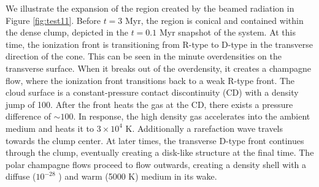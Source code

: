 \documentclass[apj,onecolumn]{emulateapj}
\begin{document}
We illustrate the expansion of the  region created by the
beamed radiation in Figure \ref{fig:test11}.  Before $t = 3$ Myr, the
 region is conical and contained within the dense clump,
depicted in the $t = 0.1$ Myr snapshot of the system.  At this time,
the ionization front is transitioning from R-type to D-type in the
transverse direction of the cone.  This can be seen in the minute
overdensities on the  transverse surface.  When it breaks
out of the overdensity, it creates a champagne flow, where the
ionization front transitions back to a weak R-type front.  The cloud
surface is a constant-pressure contact discontinuity (CD) with a
density jump of 100.  After the front heats the gas at the CD, there
exists a pressure difference of $\sim 100$.  In response, the high
density gas accelerates into the ambient medium and heats it to $3
\times 10^4$ K.  Additionally a rarefaction wave travels towards the
clump center.  At later times, the transverse D-type front continues
through the clump, eventually creating a disk-like structure at the
final time.  The polar champagne flows proceed to flow outwards,
creating a density shell with a diffuse ($10^{-28}$ \cubecm) and warm
(5000 K) medium in its wake.

% 

\end{document}
